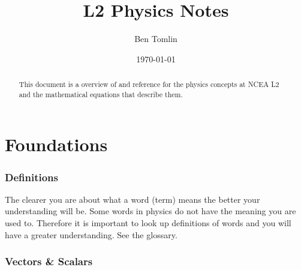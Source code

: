 \documentclass[11pt,a4paper]{article}
\date{\today}
\title{L2 Physics Notes}
\author{Ben Tomlin}
\begin{document}
\maketitle

\begin{abstract}
This document is a overview of and reference for the physics concepts at NCEA L2 and the mathematical equations that describe them. 
\end{abstract}


\tableofcontents

\part{Foundations}
\section{Definitions}
The clearer you are about what a word (term) means the better your understanding will be. Some words in physics do not
have the meaning you are used to. Therefore it is important to look up definitions of words and you will have a greater
understanding. See the glossary.

\section{Vectors \& Scalars}

\newcommand{\vc}[2]{
	\vcenter{\hbox{\begin{tikzpicture}[> = Straight Barb, vec/.style = {very thick, -{Stealth}}]
		\draw[vec] (0,0) -- (#1:#2) ;
\end{tikzpicture}}}
}

\newcommand{\vcc}[2]{
	\vcenter{\hbox{\begin{tikzpicture}[vec/.style = {very thick, -{Stealth}}]
				\draw[vec] (0,0) -- (#1:#2);
				\draw[vec,very thin] (0,0) -- (#1:#2 |- 0,0);
				\draw[vec,very thin] (#1:#2|-0,0) -- (#1:#2);
	\end{tikzpicture}}}
}

\newcommand{\vcl}[3]{
	\vcenter{\hbox{\begin{tikzpicture}[vec/.style = {very thick, -{Stealth}}]
		\draw[vec] (0,0) -- (#1:#2) ;
		\draw ($(0,0)!0.5!(#1:#2) + ({90+#1}:2ex)$) node{#3};
	\end{tikzpicture}}}
}


\newcommand{\vadd}[4]{
	\vcenter{\hbox{\tikz[vec/.style ={very thick, -{Stealth}},line join=miter]{
		\draw[vec,blue] (0,0) -- (#1:#2);
		\draw[vec,blue] (#1:#2) -- ++(#3:#4);
		\draw[red,postaction=decorate,decoration={markings, mark=at position 0.5 with {\arrow{>>}}}] (0,0) -- ($(#1:#2)+(#3:#4)$) node(R){};
		
		\draw ($(0,0)!0.5!(#1:#2) + ({#1+(#2*sin(#1)+#4*sin(#3)>0?90:-90)}:-1.4ex)$) node{A};
		\draw ($(#1:#2)!0.5!(R) + ({#3+(#2*sin(#1)+#4*sin(#3)>0?90:-90)}:-1.4ex)$) node{B};
		\draw ($(0,0)!0.5!(R) + ({#3+(#2*sin(#1)+#4*sin(#3)>0?-90:90)}:-2ex)$) node[shape=circle]{A+B};
	}}}
}
\end{document}
